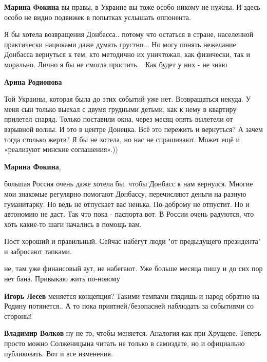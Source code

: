 \begin{itemize}
\begin{itemize}
\textbf{Марина Фокина} вы правы, в Украине вы тоже особо никому не нужны. И здесь особо не видно подвижек в попытках услышать оппонента.


Я бы хотела возвращения Донбасса.. потому что остаться в стране, населенной
практически нацюками даже думать грустно... Но могу понять нежелание Донбасса
вернуться к тем, кто методично их уничтожал, как физически, так и морально.
Лично я бы не смогла простить... Как будет у них - не знаю

\textbf{Арина Родионова} 

Той Украины, которая была до этих событий уже нет. Возвращаться некуда. У меня
сын только выехал с двумя грудными детьми, как к нему в квартиру прилетел
снаряд. Только поставили окна, через месяц опять вылетели от взрывной волны. И
это в центре Донецка. Всё это пережить и вернуться? А зачем тогда столько
жертв? Я бы не хотела, но нас не спрашивают. Может ещё и «реализуют минские
соглашения».))

\textbf{Марина Фокина}, 

большая Россия очень даже хотела бы, чтобы Донбасс к нам вернулся. Многие мои
знакомые регулярно помогают Донбассу, перечисляют деньги на разную гуманитарку.
Но ведь не отпускает вас ненька. По-доброму не отпустит. Но и автономию не
даст. Так что пока - паспорта вот. В России очень радуются, что хоть какие-то
шаги начались в помощь вам.

\end{itemize} %

Пост хороший и правильный.
Сейчас набегут люди "от предыдущего президента" и забросают тапками.

\begin{itemize} %
не, там уже финансовый аут, не набегают. Уже больше месяца пишу и до сих пор нет бана. Привыкаю жить по-новому

\textbf{Игорь Лесев} меняется концепция? Такими темпами глядишь и народ обратно на Родину потянется..
А то пока приятней/безопасней наблюдать за событиями со стороны!

\textbf{Владимир Волков} ну не то, чтобы меняется. Аналогия как при Хрущеве. Теперь просто можно Солженицына читать не только в самиздате, но и официально публиковать. Вот и все изменения.



\end{itemize}
\end{itemize}
